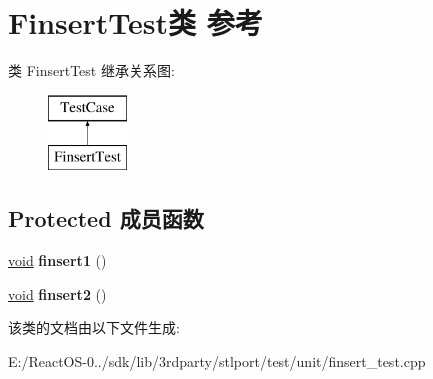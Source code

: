 \hypertarget{class_finsert_test}{}\section{Finsert\+Test类 参考}
\label{class_finsert_test}
类 Finsert\+Test 继承关系图\+:\begin{figure}[H]
\begin{center}
\leavevmode
\includegraphics[height=2.000000cm]{class_finsert_test}
\end{center}
\end{figure}
\subsection*{Protected 成员函数}
\begin{DoxyCompactItemize}
\item 
\mbox{\label{class_finsert_test_a9192716719dacac71a9871bfa2fabe34}} 
\hyperlink{interfacevoid}{void} {\bfseries finsert1} ()
\item 
\mbox{\label{class_finsert_test_a38e0f504bb54ef32eea00f98f8004d66}} 
\hyperlink{interfacevoid}{void} {\bfseries finsert2} ()
\end{DoxyCompactItemize}


该类的文档由以下文件生成\+:\begin{DoxyCompactItemize}
\item 
E\+:/\+React\+O\+S-\/0../sdk/lib/3rdparty/stlport/test/unit/finsert\+\_\+test.\+cpp\end{DoxyCompactItemize}
